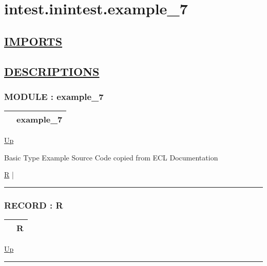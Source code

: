 \chapter*{intest.inintest.example\_7}
\hypertarget{ecldoc:toc:intest.inintest.example_7}{}

\section*{\underline{IMPORTS}}

\section*{\underline{DESCRIPTIONS}}
\subsection*{MODULE : example\_7}
\hypertarget{ecldoc:intest.inintest.example_7}{}

{\renewcommand{\arraystretch}{1.5}
\begin{tabularx}{\textwidth}{|>{\raggedright\arraybackslash}l|X|}
\hline
\hspace{0pt} & example\_7 \\
\hline
\end{tabularx}
}

\hyperlink{ecldoc:toc:intest/inintest}{Up}

\par
Basic Type Example Source Code copied from ECL Documentation


\hyperlink{ecldoc:intest.inintest.example_7.r}{R}  |

\rule{\textwidth}{0.4pt}

\subsection*{RECORD : R}
\hypertarget{ecldoc:intest.inintest.example_7.r}{}

{\renewcommand{\arraystretch}{1.5}
\begin{tabularx}{\textwidth}{|>{\raggedright\arraybackslash}l|X|}
\hline
\hspace{0pt} & R \\
\hline
\end{tabularx}
}

\hyperlink{ecldoc:intest.inintest.example_7}{Up}

\par


\rule{\textwidth}{0.4pt}


